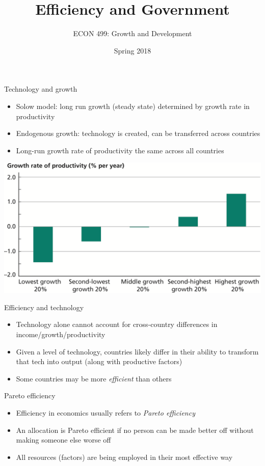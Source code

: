 \documentclass[10pt]{beamer}
\author{ECON 499: Growth and Development}
\date{Spring 2018}
\title{Efficiency and Government}
\begin{document}
\maketitle

\begin{frame}[label={sec:orgaa05141}]{}
\alert{Technology and growth}
\begin{itemize}
\item Solow model: long run growth (steady state) determined by growth rate in productivity
\item Endogenous growth: technology is \alert{created}, can be transferred across countries
\item Long-run growth rate of productivity the same across all countries
\end{itemize}
\end{frame}

\begin{frame}[label={sec:orgcbe65c3}]{}
\begin{center}
\includegraphics[width=.75\textwidth]{./img/7.6.png}
\end{center}
\end{frame}

\begin{frame}[label={sec:org78c8ec8}]{}
\alert{Efficiency and technology}
\begin{itemize}
\item Technology alone cannot account for cross-country differences in income/growth/productivity
\item Given a level of technology, countries likely differ in their ability to transform that tech into output (along with productive factors)
\item Some countries may be more \emph{efficient} than others
\end{itemize}
\end{frame}

\begin{frame}[label={sec:org53fa852}]{}
\alert{Pareto efficiency}
\begin{itemize}
\item Efficiency in economics usually refers to \emph{Pareto efficiency}
\item An allocation is Pareto efficient if no person can be made better off without making someone else worse off
\item All resources (factors) are being employed in their most effective way
\end{itemize}
\end{frame}
\end{document}
